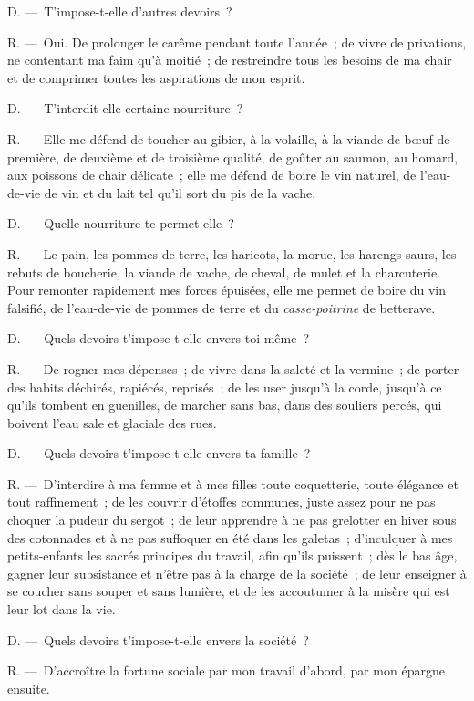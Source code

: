 \documentclass[french,twoside]{book} %
\begin{document}
D. — T'impose-t-elle d’autres devoirs ?\par
R. — Oui. De prolonger le carême pendant toute l’année ; de vivre de privations, ne contentant ma faim qu’à moitié ; de restreindre tous les besoins de ma chair et de comprimer toutes les aspirations de mon esprit.\par
D. — T'interdit-elle certaine nourriture ?\par
R. — Elle me défend de toucher au gibier, à la volaille, à la viande de bœuf de première, de deuxième et de troisième qualité, de goûter au saumon, au homard, aux poissons de chair délicate ; elle me défend de boire le vin naturel, de l’eau-de-vie de vin et du lait tel qu’il sort du pis de la vache.\par
D. — Quelle nourriture te permet-elle ?\par
R. — Le pain, les pommes de terre, les haricots, la morue, les harengs saurs, les rebuts de boucherie, la viande de vache, de cheval, de mulet et la charcuterie. Pour remonter rapidement mes forces épuisées, elle me permet de boire du vin falsifié, de l’eau-de-vie de pommes de terre et du \emph{casse-poitrine} de betterave.\par
D. — Quels devoirs t’impose-t-elle envers toi-même ?\par
R. — De rogner mes dépenses ; de vivre dans la saleté et la vermine ; de porter des habits déchirés, rapiécés, reprisés ; de les user jusqu’à la corde, jusqu’à ce qu’ils tombent en guenilles, de marcher sans bas, dans des souliers percés, qui boivent l’eau sale et glaciale des rues.\par
D. — Quels devoirs t’impose-t-elle envers ta famille ?\par
R. — D'interdire à ma femme et à mes filles toute coquetterie, toute élégance et tout raffinement ; de les couvrir d’étoffes communes, juste assez pour ne pas choquer la pudeur du sergot ; de leur apprendre à ne pas grelotter en hiver sous des cotonnades et à ne pas suffoquer en été dans les galetas ; d’inculquer à mes petits-enfants les sacrés principes du travail, afin qu’ils puissent ; dès le bas âge, gagner leur subsistance et n’être pas à la charge de la société ; de leur enseigner à se coucher sans souper et sans lumière, et de les accoutumer à la misère qui est leur lot dans la vie.\par
D. — Quels devoirs t’impose-t-elle envers la société ?\par
R. — D'accroître la fortune sociale par mon travail d’abord, par mon épargne ensuite.\par
\end{document}
